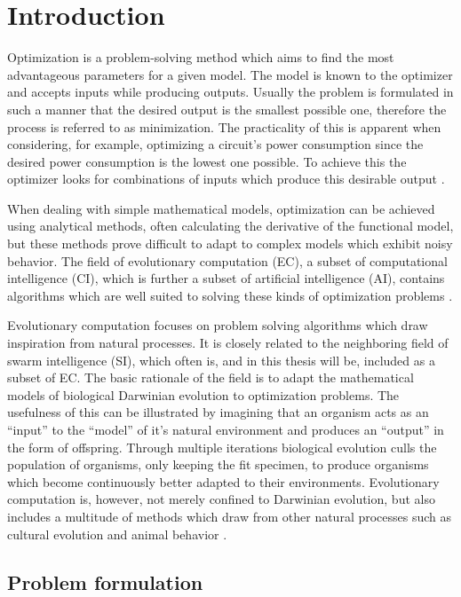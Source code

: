 \section{Introduction}

Optimization is a problem-solving method which aims to find the most advantageous parameters for a given model. The model is known to the optimizer and accepts inputs while producing outputs. Usually the problem is formulated in such a manner that the desired output is the smallest possible one, therefore the process is referred to as minimization. The practicality of this is apparent when considering, for example, optimizing a circuit's power consumption since the desired power consumption is the lowest one possible. To achieve this the optimizer looks for combinations of inputs which produce this desirable output \cite{Eiben2015_origins}.

When dealing with simple mathematical models, optimization can be achieved using analytical methods, often calculating the derivative of the functional model, but these methods prove difficult to adapt to complex models which exhibit noisy behavior. The field of evolutionary computation (EC), a subset of computational intelligence (CI), which is further a subset of artificial intelligence (AI), contains algorithms which are well suited to solving these kinds of optimization problems \cite{Michalewicz1997,zhang2015comprehensive}.

Evolutionary computation focuses on problem solving algorithms which draw inspiration from natural processes. It is closely related to the neighboring field of swarm intelligence (SI), which often is, and in this thesis will be, included as a subset of EC. The basic rationale of the field is to adapt the mathematical models of biological Darwinian evolution to optimization problems. The usefulness of this can be illustrated by imagining that an organism acts as an ``input'' to the ``model'' of it's natural environment and produces an ``output'' in the form of offspring. Through multiple iterations biological evolution culls the population of organisms, only keeping the fit specimen, to produce organisms which become continuously better adapted to their environments. Evolutionary computation is, however, not merely confined to Darwinian evolution, but also includes a multitude of methods which draw from other natural processes such as cultural evolution and animal behavior \cite{engelbrecht2007computational}.

\subsection{Problem formulation}

